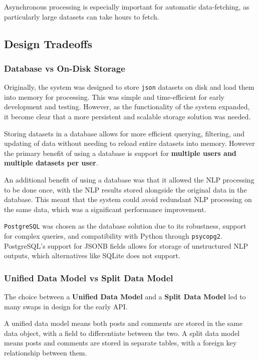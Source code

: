 \documentclass[12pt, a4paper]{article}
\begin{document}
Asynchronous processing is especially important for automatic data-fetching, as particularly large datasets can take hours to fetch.


\subsection{Design Tradeoffs}
\subsubsection{Database vs On-Disk Storage}
Originally, the system was designed to store \texttt{json} datasets on disk and load them into memory for processing. This was simple and time-efficient for early development and testing. However, as the functionality of the system expanded, it become clear that a more persistent and scalable storage solution was needed.

Storing datasets in a database allows for more efficient querying, filtering, and updating of data without needing to reload entire datasets into memory. However the primary benefit of using a database is support for \textbf{ multiple users and multiple datasets per user}.

An additional benefit of using a database was that it allowed the NLP processing to be done once, with the NLP results stored alongside the original data in the database. This meant that the system could avoid redundant NLP processing on the same data, which was a significant performance improvement.

\texttt{PostgreSQL} was chosen as the database solution due to its robustness, support for complex queries, and compatibility with Python through \texttt{psycopg2}. PostgreSQL's support for JSONB fields allows for storage of unstructured NLP outputs, which alternatives like SQLite does not support.

\subsubsection{Unified Data Model vs Split Data Model}
The choice between a \textbf{Unified Data Model} and a \textbf{Split Data Model} led to many swaps in design for the early API. 

A unified data model means both posts and comments are stored in the same data object, with a field to differentiate between the two. A split data model means posts and comments are stored in separate tables, with a foreign key relationship between them.
\end{document}
